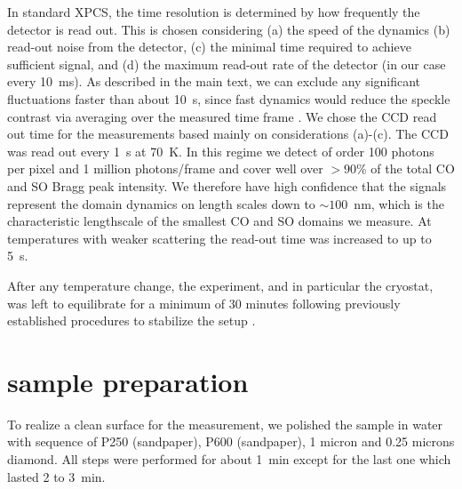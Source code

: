 \documentclass[aps,prl,showpacs,floatfix,onecolumn,superscriptaddress,longbibliography,notitlepage]{revtex4-1}
\begin{document}
In standard \gls{XPCS}, the time resolution is determined by how frequently the detector is read out. This is chosen considering (a) the speed of the dynamics (b) read-out noise from the detector, (c) the minimal time required to achieve sufficient signal, and (d) the maximum read-out rate of the detector (in our case every 10~ms). As described in the main text, we can exclude any significant fluctuations faster than about 10~s, since fast dynamics would reduce the speckle contrast via averaging over the measured time frame \cite{Chen2016LBCO}. We chose the CCD read out time for the measurements based mainly on considerations (a)-(c). The CCD was read out every 1~s at 70~K. In this regime we detect of order 100 photons per pixel and 1 million photons/frame and cover well over $>90$\% of the total \gls*{CO} and \gls*{SO} Bragg peak intensity. We therefore have high confidence that the signals represent the domain dynamics on length scales down to $\sim100$~nm, which is the characteristic lengthscale of the smallest \gls*{CO} and \gls*{SO} domains we measure. At temperatures with weaker scattering the read-out time was increased to up to 5~s.

After any temperature change, the experiment, and in particular the cryostat, was left to equilibrate for a minimum of 30 minutes following previously established procedures to stabilize the setup \cite{Chen2016LBCO, Chen2019LBCO, Kukreja2018orbital}.

\section{sample preparation}

To realize a clean surface for the measurement, we polished the sample in water with sequence of P250 (sandpaper), P600 (sandpaper), 1 micron and 0.25 microns diamond. All steps were performed for about 1~min except for the last one which lasted 2 to 3~min.
\end{document}
